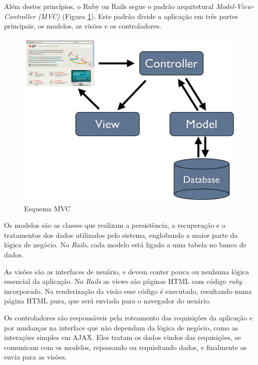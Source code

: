 Além destes princípios, o Ruby on Rails segue o padrão arquitetural \textit{Model-View-Controller (MVC)} (Figura \ref{figura_23}). Este padrão divide a aplicação em três partes principais, os modelos, as visões e os controladores.

\begin{figure}[ht]
    \centering
    \includegraphics[width=0.9 \textwidth]{figuras/mvc}
    \caption{Esquema MVC}
    \label{figura_23}
\end{figure}

Os modelos são as classes que realizam a persistência, a recuperação e o tratamentos dos dados utilizados pelo sistema, englobando a maior parte da lógica de negócio. No \textit{Rails}, cada modelo está ligado a uma tabela no banco de dados.

As visões são as interfaces de usuário, e devem conter pouca ou nenhuma lógica essencial da aplicação. No \textit{Rails} as views são páginas HTML com código \textit{ruby} incorporado. Na renderização da visão esse código é executado, resultando numa página HTML pura, que será enviada para o navegador do usuário.

Os controladores são responsáveis pela roteamento das requisições da aplicação e por mudanças na interface que não dependam da lógica de negócio, como as interações simples em AJAX. Eles tratam os dados vindos das requisições, se comunicam com os modelos, repassando ou requisitando dados, e finalmente os envia para as visões.
